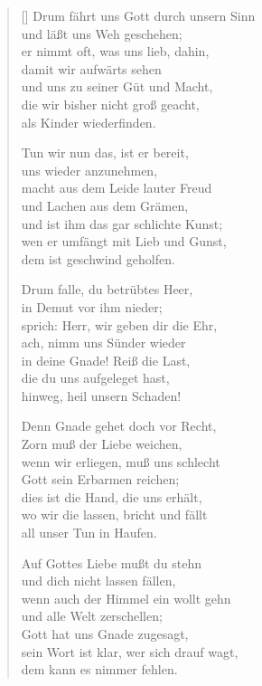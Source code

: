 \begin{multicols}{2}
\begin{verse}[\versewidth]
 Drum fährt uns Gott durch unsern Sinn\\
und läßt uns Weh geschehen;\\
er nimmt oft, was uns lieb, dahin,\\
damit wir aufwärts sehen\\
und uns zu seiner Güt und Macht,\\
die wir bisher nicht groß geacht,\\
als Kinder wiederfinden.

 Tun wir nun das, ist er bereit,\\
uns wieder anzunehmen,\\
macht aus dem Leide lauter Freud\\
und Lachen aus dem Grämen,\\
und ist ihm das gar schlichte Kunst;\\
wen er umfängt mit Lieb und Gunst,\\
dem ist geschwind geholfen.

 Drum falle, du betrübtes Heer,\\
in Demut vor ihm nieder;\\
sprich: Herr, wir geben dir die Ehr,\\
ach, nimm uns Sünder wieder\\
in deine Gnade! Reiß die Last,\\
die du uns aufgeleget hast,\\
hinweg, heil unsern Schaden!

 Denn Gnade gehet doch vor Recht,\\
Zorn muß der Liebe weichen,\\
wenn wir erliegen, muß uns schlecht\\
Gott sein Erbarmen reichen;\\
dies ist die Hand, die uns erhält,\\
wo wir die lassen, bricht und fällt\\
all unser Tun in Haufen.

 Auf Gottes Liebe mußt du stehn\\
und dich nicht lassen fällen,\\
wenn auch der Himmel ein wollt gehn\\
und alle Welt zerschellen;\\
Gott hat uns Gnade zugesagt,\\
sein Wort ist klar, wer sich drauf wagt,\\
dem kann es nimmer fehlen.


\end{verse}
\end{multicols}

